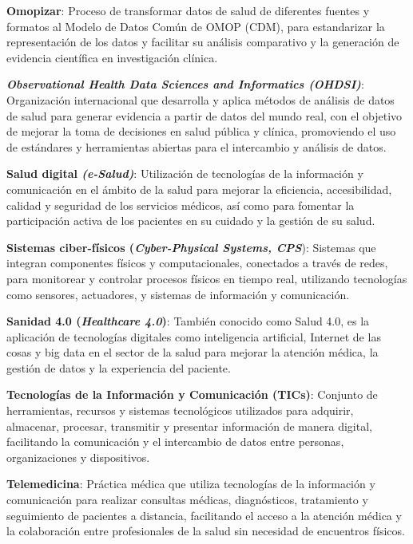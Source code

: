 \textbf{Omopizar}: Proceso de transformar datos de salud de diferentes fuentes y formatos al Modelo de Datos Común de OMOP (CDM), para estandarizar la representación de los datos y facilitar su análisis comparativo y la generación de evidencia científica en investigación clínica.

\textbf{\textit{Observational Health Data Sciences and Informatics (OHDSI)}}: Organización internacional que desarrolla y aplica métodos de análisis de datos de salud para generar evidencia a partir de datos del mundo real, con el objetivo de mejorar la toma de decisiones en salud pública y clínica, promoviendo el uso de estándares y herramientas abiertas para el intercambio y análisis de datos.





\textbf{Salud digital \textit{(e-Salud)}}: Utilización de tecnologías de la información y comunicación en el ámbito de la salud para mejorar la eficiencia, accesibilidad, calidad y seguridad de los servicios médicos, así como para fomentar la participación activa de los pacientes en su cuidado y la gestión de su salud.

\textbf{Sistemas ciber-físicos (\textit{Cyber-Physical Systems, CPS}}): Sistemas que integran componentes físicos y computacionales, conectados a través de redes, para monitorear y controlar procesos físicos en tiempo real, utilizando tecnologías como sensores, actuadores, y sistemas de información y comunicación.

\textbf{Sanidad 4.0 (\textit{Healthcare 4.0})}: También conocido como Salud 4.0, es la aplicación de tecnologías digitales como inteligencia artificial, Internet de las cosas y big data en el sector de la salud para mejorar la atención médica, la gestión de datos y la experiencia del paciente.



\textbf{Tecnologías de la Información y Comunicación (TICs)}: Conjunto de herramientas, recursos y sistemas tecnológicos utilizados para adquirir, almacenar, procesar, transmitir y presentar información de manera digital, facilitando la comunicación y el intercambio de datos entre personas, organizaciones y dispositivos.

\textbf{Telemedicina}: Práctica médica que utiliza tecnologías de la información y comunicación para realizar consultas médicas, diagnósticos, tratamiento y seguimiento de pacientes a distancia, facilitando el acceso a la atención médica y la colaboración entre profesionales de la salud sin necesidad de encuentros físicos.







